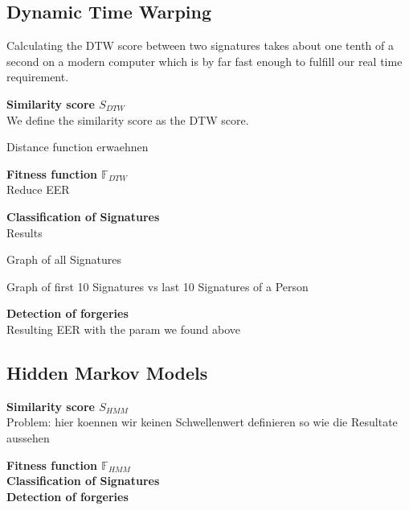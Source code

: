 \documentclass[a4paper, oneside]{csthesis}
\begin{document}

\subsection{Dynamic Time Warping}

Calculating the DTW score between two signatures takes about one tenth of a second on a modern computer which is by far fast enough to fulfill our real time requirement.

\textbf{Similarity score $S_{DTW}$}\\
We define the similarity score as the DTW score.

Distance function erwaehnen

\textbf{Fitness function $\mathbb{F}_{DTW}$}\\

Reduce EER


\textbf{Classification of Signatures}\\
Results

Graph of all Signatures

Graph of first 10 Signatures vs last 10 Signatures of a Person

\textbf{Detection of forgeries}\\

Resulting EER with the param we found above


\subsection{Hidden Markov Models}

\textbf{Similarity score $S_{HMM}$}\\

Problem: hier koennen wir keinen Schwellenwert definieren so wie die Resultate aussehen

\textbf{Fitness function $\mathbb{F}_{HMM}$}\\

\textbf{Classification of Signatures}\\

\textbf{Detection of forgeries}\\



\end{document}
